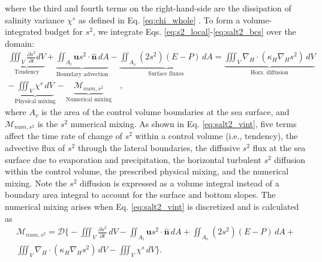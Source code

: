 where the third and fourth terms on the right-hand-side are the dissipation of salinity variance $\chi^s$ as defined in Eq. \ref{eq:chi_whole} \citep{Burchard_2008}. To form a volume-integrated budget for $s^2$, we integrate Eqs. \ref{eq:s2_local}-\ref{eq:salt2_bcs} over the domain:
\begin{equation} \label{eq:salt2_vint}
    \begin{split}
        \underbrace{\iiint_V \frac{\partial s^2}{\partial t}  dV}_{\text{Tendency}} + \underbrace{\iint_{A_l} \mathbf{u}s^2 \cdot \hat{\mathbf{n}} \,  dA}_{\text{Boundary advection}}  - \underbrace{\iint_{A_{v}} \left(2s^2 \right)(E-P) \, dA}_{\text{Surface fluxes}} = \underbrace{\iiint_{V} \nabla_H \cdot (\kappa_H \nabla_H s^2) \, dV}_{\text{Horz. diffusion}}\\
        -\underbrace{\iiint_V \chi^s \, dV}_{\text{Physical mixing}}-\underbrace{\mathcal{M}_{num, s^2}}_{\text{Numerical mixing}} \quad ,
   \end{split}
\end{equation}
where $A_v$ is the area of the control volume boundaries at the sea surface, and $\mathcal{M}_{num, s^2}$ is the $s^2$ numerical mixing. As shown in Eq. \ref{eq:salt2_vint}, five terms affect the time rate of change of $s^2$ within a control volume (i.e., tendency), the advective flux of $s^2$ through the lateral boundaries, the diffusive $s^2$ flux at the sea surface due to evaporation and precipitation, the horizontal turbulent $s^2$ diffusion within the control volume, the prescribed physical mixing, and the numerical mixing. Note the $s^2$ diffusion is expressed as a volume integral instead of a boundary area integral to account for the surface and bottom slopes. The numerical mixing arises when Eq. \ref{eq:salt2_vint} is discretized and is calculated as 
\begin{equation} \label{eq:salt2_mnum}
    \begin{split}
        \mathcal{M}_{num, s^2} = \mathcal{D} \biggl\{-\iiint_V \frac{\partial s^2}{\partial t} \, dV - \iint_{A_l} \mathbf{u}s^2 \cdot \hat{\mathbf{n}} \,  dA + \iint_{A_{v}} \left(2s^2 \right)(E-P) \, dA + \\
        \iiint_{V} \nabla_H \cdot \left(\kappa_H \nabla_H s^2 \right) \, dV - \iiint_V \chi^s \, dV\biggl\}.
   \end{split}
\end{equation}
